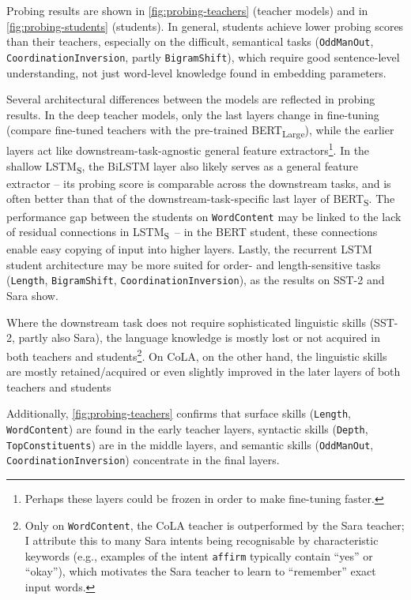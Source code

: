 \documentclass[bsc,frontabs,singlespacing,parskip,deptreport]{infthesis}
\def\BERTS{BERT\textsubscript{S}}
\def\LSTMS{LSTM\textsubscript{S}}
\begin{document}
{{    Probing results are shown in \autoref{fig:probing-teachers} (teacher models) and in \autoref{fig:probing-students} (students).
    In general, students achieve lower probing scores than their teachers,
    especially on the difficult, semantical tasks (\verb|OddManOut|, \verb|CoordinationInversion|, partly \verb|BigramShift|), which require good sentence-level understanding,
    not just word-level knowledge found in embedding parameters.

    Several architectural differences between the models are reflected in probing results.
    In the deep teacher models, only the last layers change in fine-tuning (compare fine-tuned teachers with the pre-trained BERT\textsubscript{Large}), while the earlier layers act like downstream-task-agnostic general feature extractors\footnote{Perhaps these layers could be frozen in order to make fine-tuning faster.}.
    In the shallow \LSTMS, the BiLSTM layer also likely serves as a general feature extractor -- its probing score is comparable across the downstream tasks, and is often better than that of the downstream-task-specific last layer of \BERTS.
    The performance gap between the students on \verb|WordContent| may be linked to the lack of residual connections in \LSTMS~-- in the BERT student, these connections enable easy copying of input into higher layers.
    Lastly, the recurrent LSTM student architecture may be more suited for order- and length-sensitive tasks (\verb|Length|, \verb|BigramShift|, \verb|CoordinationInversion|), as the results on SST-2 and Sara show.

    Where the downstream task does not require sophisticated linguistic skills (SST-2, partly also Sara), the language knowledge is mostly lost or not acquired in both teachers and students\footnote{Only on \verb|WordContent|, the CoLA teacher is outperformed by the Sara teacher; I attribute this to many Sara intents being recognisable by characteristic keywords (e.g., examples of the intent \verb|affirm| typically contain ``yes'' or ``okay''), which motivates the Sara teacher to learn to ``remember'' exact input words.}.
    On CoLA, on the other hand, the linguistic skills are mostly retained/acquired or even slightly improved in the later layers of both teachers and students
    
    Additionally, \autoref{fig:probing-teachers} confirms that surface skills (\verb|Length|, \verb|WordContent|) are found in the early teacher layers, syntactic skills (\verb|Depth|, \verb|TopConstituents|) are in the middle layers, and semantic skills (\verb|OddManOut|, \verb|CoordinationInversion|) concentrate in the final layers.
    
}}
\end{document}
